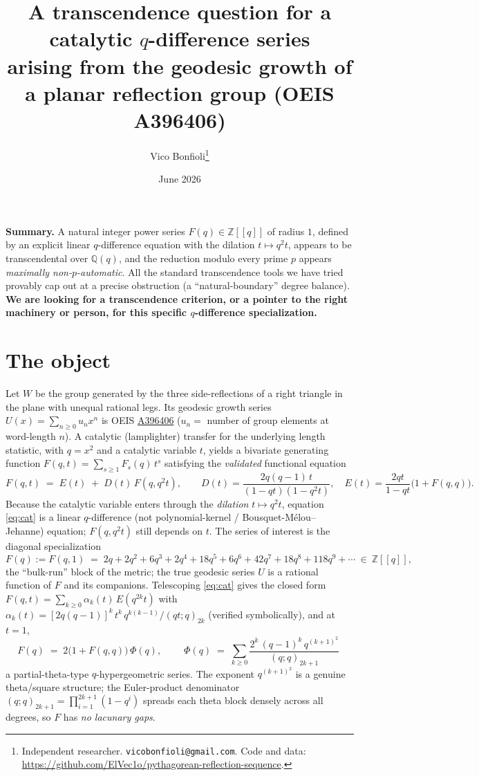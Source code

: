 \documentclass[11pt]{article}
\title{\textbf{A transcendence question for a catalytic $q$-difference series}\\[0.2em]
\large arising from the geodesic growth of a planar reflection group (OEIS A396406)}
\author{Vico Bonfioli\thanks{Independent researcher. \texttt{vicobonfioli@gmail.com}. Code and data:
\url{https://github.com/ElVec1o/pythagorean-reflection-sequence}.}}
\date{June 2026}
\newcommand{\Q}{\mathbb{Q}}
\newcommand{\Z}{\mathbb{Z}}
\begin{document}
\maketitle

\noindent\textbf{Summary.} A natural integer power series $F(q)\in\Z[[q]]$ of radius $1$, defined by an
explicit linear $q$-difference equation with the dilation $t\mapsto q^2t$, appears to be transcendental
over $\Q(q)$, and the reduction modulo every prime $p$ appears \emph{maximally non-$p$-automatic}.
All the standard transcendence tools we have tried provably cap out at a precise obstruction (a
``natural-boundary'' degree balance). \textbf{We are looking for a transcendence criterion, or a pointer to
the right machinery or person, for this specific $q$-difference specialization.}

\section*{The object}

Let $W$ be the group generated by the three side-reflections of a right triangle in the plane with
unequal rational legs. Its geodesic growth series $U(x)=\sum_{n\ge0}u_n x^n$ is OEIS
\href{https://oeis.org/A396406}{A396406} ($u_n=$ number of group elements at word-length $n$). A
catalytic (lamplighter) transfer for the underlying length statistic, with $q=x^2$ and a catalytic
variable $t$, yields a bivariate generating function $F(q,t)=\sum_{s\ge1}F_s(q)\,t^s$ satisfying the
\emph{validated} functional equation
\begin{equation}\label{eq:cat}
F(q,t)\;=\;E(t)\;+\;D(t)\,F(q,q^2t),
\qquad
D(t)=\frac{2q(q-1)\,t}{(1-qt)(1-q^2t)},
\quad
E(t)=\frac{2qt}{1-qt}\bigl(1+F(q,q)\bigr).
\end{equation}
Because the catalytic variable enters through the \emph{dilation} $t\mapsto q^2t$, equation
\eqref{eq:cat} is a linear $q$-difference (not polynomial-kernel / Bousquet-M\'elou--Jehanne) equation;
$F(q,q^2t)$ still depends on $t$. The series of interest is the diagonal specialization
\[
F(q):=F(q,1)\;=\;2q+2q^2+6q^3+2q^4+18q^5+6q^6+42q^7+18q^8+118q^9+\cdots\ \in\ \Z[[q]],
\]
the ``bulk-run'' block of the metric; the true geodesic series $U$ is a rational function of $F$ and its
companions. Telescoping \eqref{eq:cat} gives the closed form $F(q,t)=\sum_{k\ge0}\alpha_k(t)\,E(q^{2k}t)$
with $\alpha_k(t)=[2q(q-1)]^k\,t^k\,q^{k(k-1)}/(qt;q)_{2k}$ (verified symbolically), and at $t=1$,
\begin{equation}\label{eq:theta}
F(q)\;=\;2\bigl(1+F(q,q)\bigr)\,\Phi(q),
\qquad
\boxed{\;\Phi(q)\;=\;\sum_{k\ge0}\frac{2^k\,(q-1)^k\,q^{(k+1)^2}}{(q;q)_{2k+1}}\;}
\end{equation}
a partial-theta-type $q$-hypergeometric series. The exponent $q^{(k+1)^2}$ is a genuine theta/square
structure; the Euler-product denominator $(q;q)_{2k+1}=\prod_{i=1}^{2k+1}(1-q^i)$ spreads each theta
block densely across all degrees, so $F$ has \emph{no lacunary gaps}.
\end{document}
